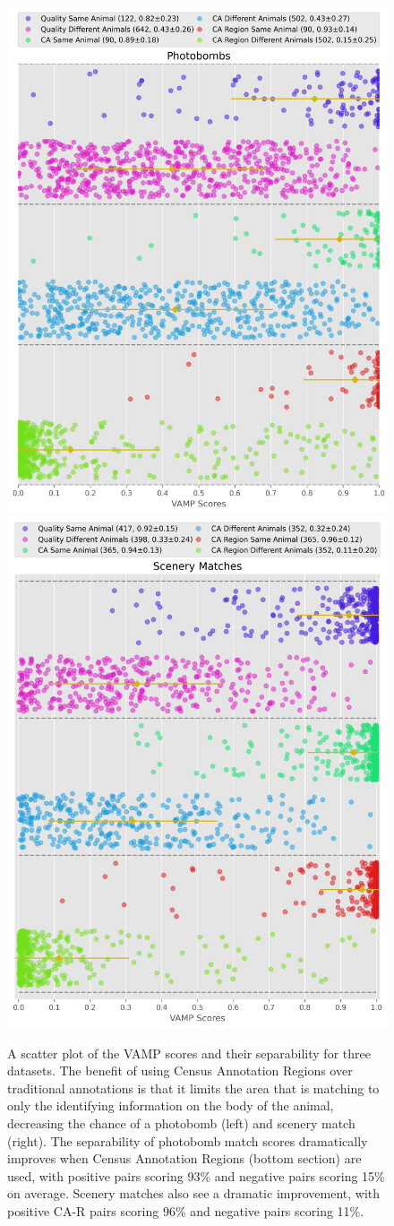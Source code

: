 \begin{figure}[!t]
    \begin{center}
        \includegraphics[width=0.48\linewidth]{resources/vamp-incidental-2.pdf}
        \includegraphics[width=0.48\linewidth]{resources/vamp-incidental-1.pdf}
    \end{center}
    \caption{A scatter plot of the VAMP scores and their separability for three datasets.  The benefit of using Census Annotation Regions over traditional annotations is that it limits the area that is matching to only the identifying information on the body of the animal, decreasing the chance of a photobomb (left) and scenery match (right). The separability of photobomb match scores dramatically improves when Census Annotation Regions (bottom section) are used, with positive pairs scoring 93\% and negative pairs scoring 15\% on average.  Scenery matches also see a dramatic improvement, with positive CA-R pairs scoring 96\% and negative pairs scoring 11\%.}
    \label{fig:vamp-photobomb-scenerymatch}
\end{figure}

